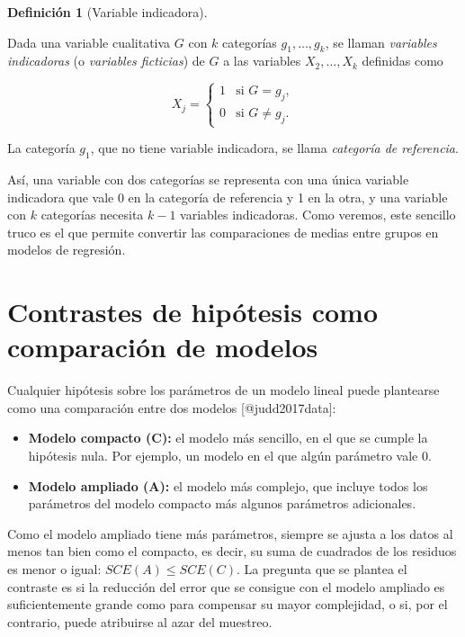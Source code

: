 \documentclass[
  spanish,
  a4paper,
]{scrreport}
\providecommand{\tightlist}{%
  \setlength{\itemsep}{0pt}\setlength{\parskip}{0pt}}
\theoremstyle{plain}
\theoremstyle{definition}
\theoremstyle{definition}
\newtheorem{definition}{Definición}[chapter]
\theoremstyle{remark}
\begin{document}
\begin{definition}[Variable
indicadora]\protect\hypertarget{def-variable-indicadora}{}\label{def-variable-indicadora}

Dada una variable cualitativa \(G\) con \(k\) categorías
\(g_1,\ldots,g_k\), se llaman \emph{variables indicadoras} (o
\emph{variables ficticias}) de \(G\) a las variables \(X_2,\ldots,X_k\)
definidas como

\[
X_j = \begin{cases}
1 & \mbox{si } G=g_j,\\
0 & \mbox{si } G\neq g_j.
\end{cases}
\]

La categoría \(g_1\), que no tiene variable indicadora, se llama
\emph{categoría de referencia}.

\end{definition}

Así, una variable con dos categorías se representa con una única
variable indicadora que vale 0 en la categoría de referencia y 1 en la
otra, y una variable con \(k\) categorías necesita \(k-1\) variables
indicadoras. Como veremos, este sencillo truco es el que permite
convertir las comparaciones de medias entre grupos en modelos de
regresión.

\section{Contrastes de hipótesis como comparación de
modelos}\label{contrastes-de-hipuxf3tesis-como-comparaciuxf3n-de-modelos}

Cualquier hipótesis sobre los parámetros de un modelo lineal puede
plantearse como una comparación entre dos modelos {[}@judd2017data{]}:

\begin{itemize}
\tightlist
\item
  \textbf{Modelo compacto (C):} el modelo más sencillo, en el que se
  cumple la hipótesis nula. Por ejemplo, un modelo en el que algún
  parámetro vale 0.
\item
  \textbf{Modelo ampliado (A):} el modelo más complejo, que incluye
  todos los parámetros del modelo compacto más algunos parámetros
  adicionales.
\end{itemize}

Como el modelo ampliado tiene más parámetros, siempre se ajusta a los
datos al menos tan bien como el compacto, es decir, su suma de cuadrados
de los residuos es menor o igual: \(SCE(A)\leq SCE(C)\). La pregunta que
se plantea el contraste es si la reducción del error que se consigue con
el modelo ampliado es suficientemente grande como para compensar su
mayor complejidad, o si, por el contrario, puede atribuirse al azar del
muestreo.
\end{document}
